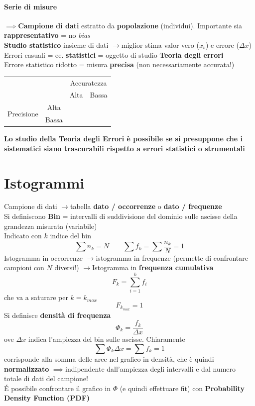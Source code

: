 \documentclass[10pt, oneside]{book}
\newcommand{\imp}{$\implies$}
\newcommand{\rarr}{$\rightarrow$}
\begin{document}
\paragraph{Serie di misure} \imp \textbf{Campione di dati} estratto da \textbf{popolazione} (individui). Importante sia \textbf{rappresentativo} = no \textit{bias}\\
\textbf{Studio statistico} insieme di dati \rarr miglior stima valor vero ($x_b$) e errore ($\Delta x$)\\
Errori casuali = ee. \textbf{statistici} = oggetto di studio \textbf{Teoria degli errori}\\Errore statistico ridotto = misura \textbf{precisa} (non necessariamente accurata!)
\begin{table}
\centering
\begin{tabular}{ c c || c | c}
& & \multicolumn{2}{c}{Accuratezza} \\
& & Alta & Bassa \\\hline\hline
\multirow{2}{*}{Precisione} & Alta & & \\
& Bassa & & 
\end{tabular}
\end{table}\textbf{
Lo studio della Teoria degli Errori è possibile se si presuppone che i sistematici siano trascurabili rispetto a errori statistici o strumentali}

\section{Istogrammi}
Campione di dati \rarr tabella \textbf{dato / occorrenze} o \textbf{dato / frequenze}\\
Si definiscono \textbf{Bin} = intervalli di suddivisione del dominio sulle ascisse della grandezza misurata (variabile)\\
Indicato con $k$ indice del bin
\[\sum n_k = N \qquad \sum f_k = \sum \frac{n_k}{N} = 1\]
Istogramma in occorrenze \rarr istogramma in frequenze (permette di confrontare campioni con $N$ diversi!) \rarr Istogramma in \textbf{frequenza cumulativa}
\[F_k = \sum\limits_{i=1}^k f_i\]
che va a saturare per $k = k_{max}$ 
\[F_{k_{max}} = 1\]
Si definisce \textbf{densità di frequenza}
\[\Phi_k = \frac{f_k}{\Delta x}\]
ove $\Delta x$ indica l'ampiezza del bin sulle ascisse. Chiaramente
\[\sum \Phi_k \Delta x = \sum f_k = 1\]
corrisponde alla somma delle aree nel grafico in densità, che è quindi \textbf{normalizzato} \imp indipendente dall'ampiezza degli intervalli e dal numero totale di dati del campione!\\
\'E possibile confrontare il grafico in $\Phi$ (e quindi effettuare fit) con \textbf{Probability Density Function (PDF)}
\end{document}
